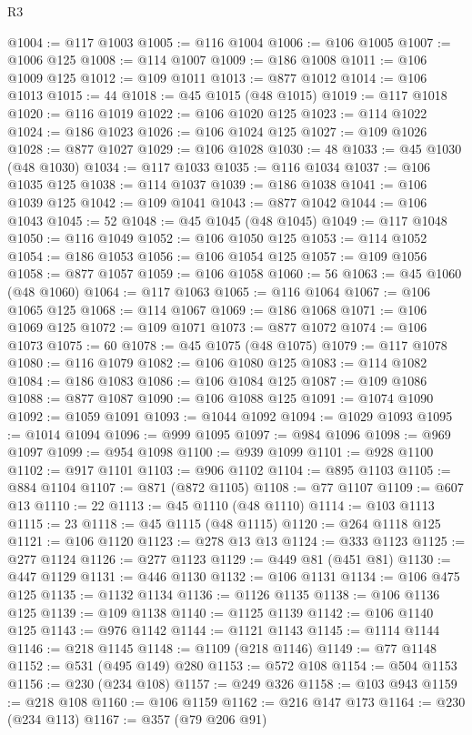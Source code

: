 \begin{lexlean}{R3}
\begin{coremodule}
@1004 := @117 @1003
@1005 := @116 @1004
@1006 := @106 @1005
@1007 := @1006 @125
@1008 := @114 @1007
@1009 := @186 @1008
@1011 := @106 @1009 @125
@1012 := @109 @1011
@1013 := @877 @1012
@1014 := @106 @1013
@1015 := 44
@1018 := @45 @1015 (@48 @1015)
@1019 := @117 @1018
@1020 := @116 @1019
@1022 := @106 @1020 @125
@1023 := @114 @1022
@1024 := @186 @1023
@1026 := @106 @1024 @125
@1027 := @109 @1026
@1028 := @877 @1027
@1029 := @106 @1028
@1030 := 48
@1033 := @45 @1030 (@48 @1030)
@1034 := @117 @1033
@1035 := @116 @1034
@1037 := @106 @1035 @125
@1038 := @114 @1037
@1039 := @186 @1038
@1041 := @106 @1039 @125
@1042 := @109 @1041
@1043 := @877 @1042
@1044 := @106 @1043
@1045 := 52
@1048 := @45 @1045 (@48 @1045)
@1049 := @117 @1048
@1050 := @116 @1049
@1052 := @106 @1050 @125
@1053 := @114 @1052
@1054 := @186 @1053
@1056 := @106 @1054 @125
@1057 := @109 @1056
@1058 := @877 @1057
@1059 := @106 @1058
@1060 := 56
@1063 := @45 @1060 (@48 @1060)
@1064 := @117 @1063
@1065 := @116 @1064
@1067 := @106 @1065 @125
@1068 := @114 @1067
@1069 := @186 @1068
@1071 := @106 @1069 @125
@1072 := @109 @1071
@1073 := @877 @1072
@1074 := @106 @1073
@1075 := 60
@1078 := @45 @1075 (@48 @1075)
@1079 := @117 @1078
@1080 := @116 @1079
@1082 := @106 @1080 @125
@1083 := @114 @1082
@1084 := @186 @1083
@1086 := @106 @1084 @125
@1087 := @109 @1086
@1088 := @877 @1087
@1090 := @106 @1088 @125
@1091 := @1074 @1090
@1092 := @1059 @1091
@1093 := @1044 @1092
@1094 := @1029 @1093
@1095 := @1014 @1094
@1096 := @999 @1095
@1097 := @984 @1096
@1098 := @969 @1097
@1099 := @954 @1098
@1100 := @939 @1099
@1101 := @928 @1100
@1102 := @917 @1101
@1103 := @906 @1102
@1104 := @895 @1103
@1105 := @884 @1104
@1107 := @871 (@872 @1105)
@1108 := @77 @1107
@1109 := @607 @13
@1110 := 22
@1113 := @45 @1110 (@48 @1110)
@1114 := @103 @1113
@1115 := 23
@1118 := @45 @1115 (@48 @1115)
@1120 := @264 @1118 @125
@1121 := @106 @1120
@1123 := @278 @13 @13
@1124 := @333 @1123
@1125 := @277 @1124
@1126 := @277 @1123
@1129 := @449 @81 (@451 @81)
@1130 := @447 @1129
@1131 := @446 @1130
@1132 := @106 @1131
@1134 := @106 @475 @125
@1135 := @1132 @1134
@1136 := @1126 @1135
@1138 := @106 @1136 @125
@1139 := @109 @1138
@1140 := @1125 @1139
@1142 := @106 @1140 @125
@1143 := @976 @1142
@1144 := @1121 @1143
@1145 := @1114 @1144
@1146 := @218 @1145
@1148 := @1109 (@218 @1146)
@1149 := @77 @1148
@1152 := @531 (@495 @149) @280
@1153 := @572 @108
@1154 := @504 @1153
@1156 := @230 (@234 @108)
@1157 := @249 @326
@1158 := @103 @943
@1159 := @218 @108
@1160 := @106 @1159
@1162 := @216 @147 @173
@1164 := @230 (@234 @113)
@1167 := @357 (@79 @206 @91)

\end{coremodule}
\end{lexlean}
